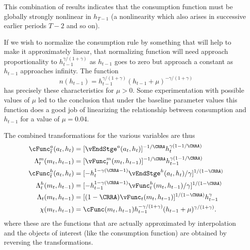 \documentclass[titlepage, headings=optiontotocandhead]{\econtex}
\begin{document}
{  This combination of results indicates that the consumption function
  must be globally strongly nonlinear in $h_{T-1}$ (a nonlinearity which
  also arises in successive earlier periods $T-2$ and so on).

  If we wish to normalize the consumption rule by something that will
  help to make it approximately linear, that normalizing function will
  need approach proportionality to $h_{t-1}^{\gamma/(1+\gamma)}$ as
  $h_{t-1}$ goes to zero but approach a constant as $h_{t-1}$ approaches
  infinity.  The function
  \begin{equation}
    n(h_{t-1}) =
    h_{t-1}^{\gamma/(1+\gamma)}(h_{t-1}+\mu)^{-\gamma/(1+\gamma)}
  \end{equation}
  has precisely these characteristics for $\mu>0$.  Some
  experimentation with possible values of $\mu$ led to the conclusion
  that under the baseline parameter values this function does a good job
  of linearizing the relationship between consumption and $h_{t-1}$ for
  a value of $\mu = 0.04$.

  The combined transformations for the various variables are thus
  \begin{equation}\begin{gathered}\begin{aligned}
        \cFunc_{\overline{t}}^{{a}}({a}_{t},h_{t})        & = [\vEndStge^{{a}}({a}_{t},h_{t})]^{-1/\CRRA} h_{t}^{\gamma(1-1/\CRRA)} \label{eq:vEndstransform} \\
        \Lambda_{t}^{m}({m}_{t},h_{t-1})   & = [{\vFunc}_{t}^{m}({m}_{t},h_{t-1})]^{-1/\CRRA} h_{t-1}^{\gamma(1-1/\CRRA)} \label{eq:vxtransform} \\
        \cFunc_{\overline{t}}^{h}({a}_{t},h_{t})       
        & =                                                  [-h_{t}^{1-\gamma(\CRRA-1)}\vEndStge^{h}({a}_{t},h_{t})/\gamma]^{1/(1-\CRRA)}  \label{eq:vEndhtransform}
        \\      \Lambda_{t}^{h}({m}_{t},h_{t-1})   & = [-h_{t-1}^{1-\gamma(\CRRA-1)}{\vFunc}_{t}^{h}({m}_{t},h_{t-1})/\gamma]^{1/(1-\CRRA)} \label{eq:vhtransform}
        \\      \Lambda_{t}({m}_{t},h_{t-1})       & = [(1-\CRRA)
        {\vFunc}_{t}({m}_{t},h_{t-1})]^{1/(1-\CRRA)} h_{t-1}^{\gamma}\label{eq:vtransform}
        \\  \chi({m}_{t},h_{t-1})       & = \cFunc({m}_{t},h_{t-1})h_{t-1}^{-\gamma/(1+\gamma)}(h_{t-1}+\mu)^{\gamma/(1+\gamma)}.
      \end{aligned}\end{gathered}\end{equation}
  where these are the functions that are actually approximated by
  interpolation and the objects of interest (like the consumption
  function) are obtained by reversing the transformations.

}
\end{document}
